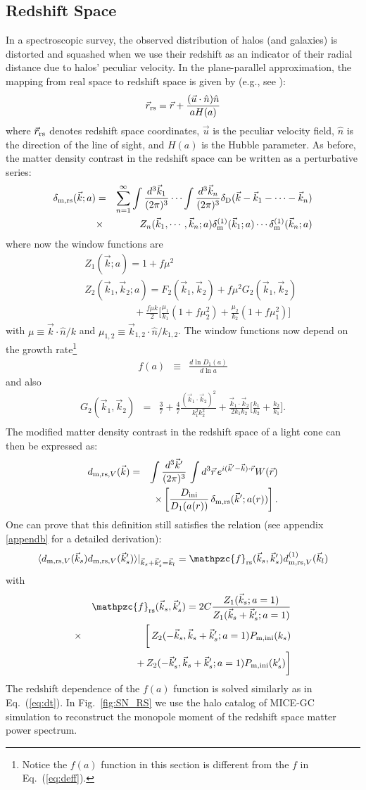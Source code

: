 \documentclass[prd,amsmath,amssymb,floatfix,superscriptaddress,nofootinbib,twocolumn]{revtex4-1}
\def\be{\begin{equation}}
\def\ee{\end{equation}}
\def\bea{\begin{eqnarray}}
\def\eea{\end{eqnarray}}
\newcommand{\m}{\rm m}
\newcommand{\rs}{\rm rs}
\newcommand{\ini}{\rm ini}
\newcommand{\vrr}{\vec{r}}
\newcommand{\vs}{\nonumber\\}
\newcommand{\vk}{\vec{k}}
\newcommand{\ec}[1]{Eq.~(\ref{eq:#1})}
\newcommand{\eql}[1]{\label{eq:#1}}
\newcommand{\rf}[1]{\ref{fig:#1}}
\begin{document}
\subsection{Redshift Space} \label{sec7}
In a spectroscopic survey, the observed distribution of halos (and galaxies) is distorted and squashed when we use their redshift as an indicator of their radial distance due to halos' peculiar velocity. In the plane-parallel approximation, the mapping from real space to redshift space is given by (e.g., see \cite{Bernardeau:2002rev}):
\be 
\vrr_{\rs} = \vrr + \frac{(\vec{u}\cdot \hat{n})\hat{n}}{aH(a)}
\ee 
where $\vrr_{\rs}$ denotes redshift space coordinates, $\vec{u}$ is the peculiar velocity field, $\hat{n}$ is the direction of the line of sight, and $H(a)$ is the Hubble parameter. As before, the matter density contrast in the redshift space can be written as a perturbative series:
\bea 
\delta_{\m,\rs}(\vk;a)&=&\sum_{n=1}^{\infty} \int\frac{d^3 \vk_1}{(2\pi)^3} \cdots \int \frac{d^3 \vk_n}{(2\pi)^3} \delta_{\rm D}(\vk-\vk_1 - \cdots -\vk_n) \nonumber \\
&\times & Z_n (\vk_1,\cdots,\vk_n;a)\delta_{\m}^{(1)}(\vk_1;a)\cdots \delta_{\m}^{(1)}(\vk_n;a) \eql{rspt} \vs
\eea
where now the window functions are
\bea 
&&Z_1(\vk;a)=1+f\mu^2 \\ 
&&Z_2(\vk_1,\vk_2;a)=F_{2}(\vk_1,\vk_2)+f\mu^2 G_2(\vk_1,\vk_2)\vs 
&&\qquad \qquad\quad+\frac{f\mu k}{2}\bigg[ \frac{\mu_1}{k_1}(1+f\mu_2^2)+\frac{\mu_2}{k_2}(1+f\mu_1^2)\bigg]
\eea 
with $\mu \equiv \vk \cdot \hat{n}/k$ and $\mu_{1,2} \equiv \vk_{1,2} \cdot \hat{n}/k_{1,2}$.  The window functions now depend on the growth rate\footnote{Notice the $f(a)$ function in this section is different from the $f$ in \ec{deff}.}
\bea 
f(a)&\equiv & \frac{d \ln D_{1}(a)}{d \ln a}\eea
and also
\bea
G_2(\vk_1,\vk_2)&=&\frac{3}{7}+\frac{4}{7}\frac{(\vk_1\cdot \vk_2)^2}{k_1^2 k_2^2}+\frac{\vk_1\cdot \vk_2}{2k_1k_2}\bigg[\frac{k_1}{k_2}+\frac{k_2}{k_1}\bigg].\vs
\eea 
The modified matter density contrast in the redshift space of a light cone can then be expressed as: 
\bea
d_{{\rm m,\rs},V}(\vk) &=&\int \frac{d^3 \vk'}{(2\pi)^3}\, \int d^3\vrr \,  e^{i(\vk'-\vk) \cdot\vrr} W(\vrr) \vs
&&\times  \left[ \frac{D_{\ini}}{D_{1}(a(r))}  
\, \delta_{\rm m,\rs}(\vk';a(r))\right].
\eea
One can prove that this definition still satisfies the relation (see appendix \ref{appendb} for a detailed derivation):
\be 
\langle d_{{\rm m,\rs },V}(\vk_s)d_{{\rm m,\rs },V}(\vk_s') \rangle|_{\vk_s+\vk_s'=\vk_l} =\mathpzc{f}_{\rs}(\vec{k}_s,\vec{k}_s'){d}^{(1)}_{{\rm m,\rs},V}(\vec{k}_l) \eql{2ptddrs}
\ee 
with 
\bea
&&\mathpzc{f}_{\rs}(\vec{k}_s,\vec{k}_s')=2C\frac{Z_{1}(\vk_s;a=1)}{Z_{1}(\vk_s+\vk_s';a=1)}\vs
&\times&\bigg[\,Z_2(-\vec{k}_s,\vec{k}_s+\vec{k}_s';a=1)P_{\rm m,ini}(k_s)\vs
&&+\,Z_2(-\vec{k}_s',\vec{k}_s+\vec{k}_s';a=1)P_{\rm m,ini}(k_s')\bigg]  \vs   
\eea 
The redshift dependence of the $f(a)$ function is solved similarly as in \ec{dt}. In Fig.~\rf{SN_RS} we use the halo catalog of MICE-GC simulation to reconstruct the monopole moment of the redshift space matter power spectrum.
\end{document}
